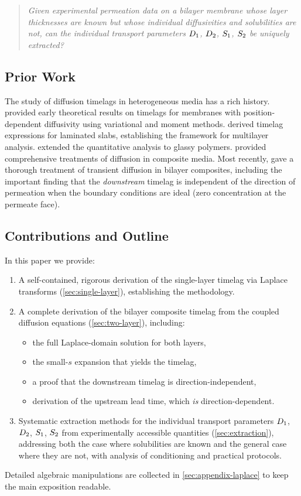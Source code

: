 \begin{quote}
\itshape
Given experimental permeation data on a bilayer membrane whose layer
thicknesses are known but whose individual diffusivities and solubilities are
\emph{not}, can the individual transport parameters $D_{1}$, $D_{2}$,
$S_{1}$, $S_{2}$ be uniquely extracted?
\end{quote}

\subsection{Prior Work}

The study of diffusion timelags in heterogeneous media has a rich history.
\textcite{Frisch1957} provided early theoretical results on timelags for
membranes with position-dependent diffusivity using variational and moment
methods.  \textcite{AshBarrerPetropoulos1963} derived timelag expressions for
laminated slabs, establishing the framework for multilayer analysis.
\textcite{Petropoulos1973} extended the quantitative analysis to glassy
polymers.  \textcite{Crank1975} provided comprehensive treatments of diffusion
in composite media.  Most recently, \textcite{TranMeldonSontag2021} gave a
thorough treatment of transient diffusion in bilayer composites, including the
important finding that the \emph{downstream} timelag is independent of the
direction of permeation when the boundary conditions are ideal (zero
concentration at the permeate face).

\subsection{Contributions and Outline}

In this paper we provide:
\begin{enumerate}
  \item A self-contained, rigorous derivation of the single-layer timelag via
        Laplace transforms (\cref{sec:single-layer}), establishing the
        methodology.
  \item A complete derivation of the bilayer composite timelag from the
        coupled diffusion equations (\cref{sec:two-layer}), including:
        \begin{itemize}
          \item the full Laplace-domain solution for both layers,
          \item the small-$s$ expansion that yields the timelag,
          \item a proof that the downstream timelag is direction-independent,
          \item derivation of the upstream lead time, which \emph{is}
                direction-dependent.
        \end{itemize}
  \item Systematic extraction methods for the individual transport parameters
        $D_{1}$, $D_{2}$, $S_{1}$, $S_{2}$ from experimentally
        accessible quantities (\cref{sec:extraction}), addressing both the
        case where solubilities are known and the general case where they are
        not, with analysis of conditioning and practical protocols.
\end{enumerate}

Detailed algebraic manipulations are collected in \cref{sec:appendix-laplace}
to keep the main exposition readable.
